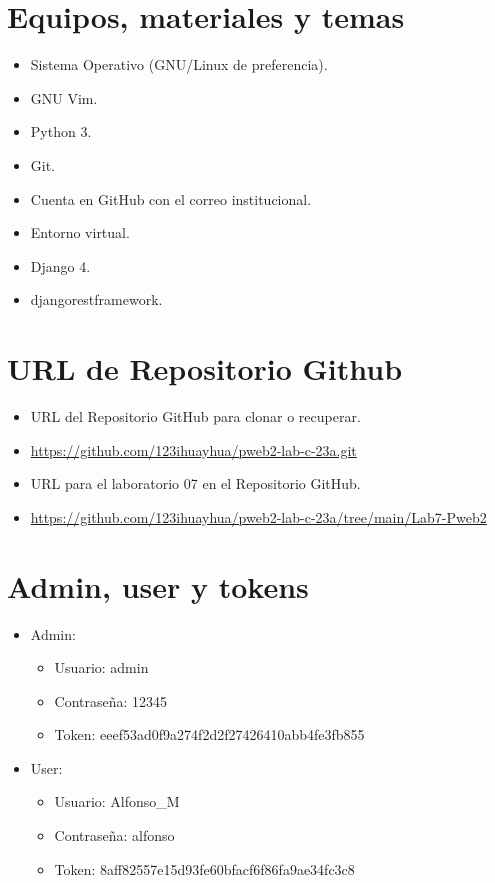 \documentclass{article}
\begin{document}
	\section{Equipos, materiales y temas}
	\begin{itemize}
		\item Sistema Operativo (GNU/Linux de preferencia).
		\item GNU Vim.
		\item Python 3.
		\item Git.
		\item Cuenta en GitHub con el correo institucional.
		\item Entorno virtual.
		\item Django 4.	
        \item djangorestframework.
	\end{itemize}
	
	\section{URL de Repositorio Github}
	\begin{itemize}
		\item URL del Repositorio GitHub para clonar o recuperar.
		\item \url{https://github.com/123ihuayhua/pweb2-lab-c-23a.git}
		\item URL para el laboratorio 07 en el Repositorio GitHub.
		\item \url{https://github.com/123ihuayhua/pweb2-lab-c-23a/tree/main/Lab7-Pweb2}
	\end{itemize}
    \section{Admin, user y tokens}
    \begin{itemize}
        \item Admin:
        \begin{itemize}
            \item Usuario: admin
            \item Contraseña: 12345
            \item Token: eeef53ad0f9a274f2d2f27426410abb4fe3fb855
        \end{itemize}
        \item User:
        \begin{itemize}
            \item Usuario: Alfonso\_M
            \item Contraseña: alfonso
            \item Token: 8aff82557e15d93fe60bfacf6f86fa9ae34fc3c8
        \end{itemize}
    \end{itemize}
\end{document}
